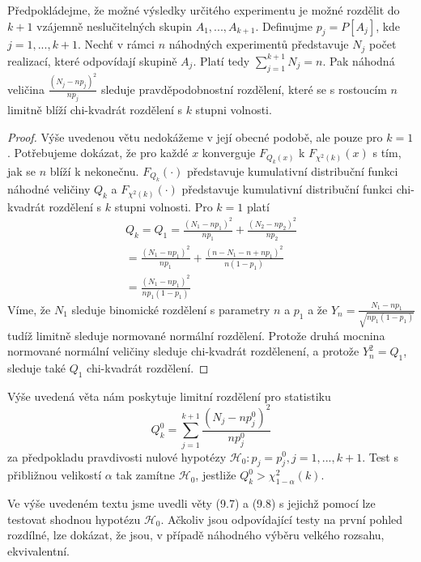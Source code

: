 \begin{theorem}
Předpokládejme, že možné výsledky určitého experimentu je možné rozdělit do $k + 1$ vzájemně neslučitelných skupin $A_1, ..., A_{k + 1}$. Definujme $p_j = P[A_j]$, kde $j = 1, ..., k + 1$. Nechť v rámci $n$ náhodných experimentů představuje $N_j$ počet realizací, které odpovídají skupině $A_j$. Platí tedy $\sum_{j = 1}^{k + 1}N_j = n$. Pak náhodná veličina $\frac{(N_j - n p_j)^2}{np_j}$ sleduje pravděpodobnostní rozdělení, které se s rostoucím $n$ limitně blíží chi-kvadrát rozdělení s $k$ stupni volnosti.
\end{theorem}

\begin{proof}
Výše uvedenou větu nedokážeme v její obecné podobě, ale pouze pro $k = 1$. Potřebujeme dokázat, že pro každé $x$ konverguje $F_{Q_k(x)}$ k $F_{\chi^2(k)}(x)$ s tím, jak se $n$ blíží k nekonečnu. $F_{Q_k}(\cdot)$ představuje kumulativní distribuční funkci náhodné veličiny $Q_k$ a $F_{\chi^2(k)}(\cdot)$ představuje kumulativní distribuční funkci chi-kvadrát rozdělení s $k$ stupni volnosti. Pro $k = 1$ platí
\begin{multline*}
Q_k = Q_1 = \frac{(N_1 - np_1)^2}{np_1} + \frac{(N_2 - np_2)^2}{np_2}\\
= \frac{(N_1 - np_1)^2}{np_1} + \frac{(n - N_1 - n + np_1)^2}{n(1 - p_1)}\\
= \frac{(N_1 - np_1)^2}{np_1(1 - p_1)}
\end{multline*}
Víme, že $N_1$ sleduje binomické rozdělení s parametry $n$ a $p_1$ a že $Y_n = \frac{N_1 - np_1}{\sqrt{np_1(1 - p_1)}}$ tudíž limitně sleduje normované normální rozdělení. Protože druhá mocnina normované normální veličiny sleduje  chi-kvadrát rozdělenení, a protože $Y_n^2 = Q_1$, sleduje také $Q_1$ chi-kvadrát rozdělení.
\end{proof}

Výše uvedená věta nám poskytuje limitní rozdělení pro statistiku
\begin{equation*}
Q_k^0 = \sum_{j = 1}^{k + 1}\frac{(N_j - np_j^0)^2}{np_j^0}
\end{equation*}
za předpokladu pravdivosti nulové hypotézy $\mathscr{H}_0: p_j = p_j^0, j = 1, ..., k + 1$. Test s přibližnou velikostí $\alpha$ tak zamítne $\mathscr{H}_0$, jestliže $Q_k^0 > \chi_{1 - \alpha}^2(k)$.

Ve výše uvedeném textu jsme uvedli věty (9.7) a (9.8) s jejichž pomocí lze testovat shodnou hypotézu $\mathscr{H}_0$. Ačkoliv jsou odpovídající testy na první pohled rozdílné, lze dokázat, že jsou, v případě náhodného výběru velkého rozsahu, ekvivalentní.

